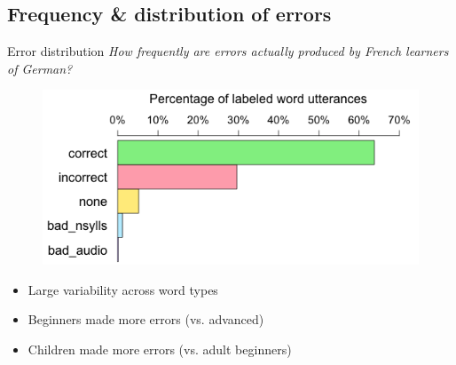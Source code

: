 \documentclass[xcolor={dvipsnames}]{beamer}
\begin{document}
	\subsection{Frequency \& distribution of errors}
		\begin{frame}{Error distribution}
		\textit{How frequently are  errors actually produced by French learners of German?}
		
		
		
		
		
		\begin{figure}
			\centering
			\includegraphics[width=.8\textwidth]{overallJudgments-axisTop-noLabels}

			\label{fig:results:overallbars}
		\end{figure}
		
		\begin{itemize}
		\item Large variability across word types %
		\item Beginners made more errors (vs. advanced)
		\item Children made more errors (vs. adult beginners)
		\end{itemize}
		\end{frame}
		
\end{document}

